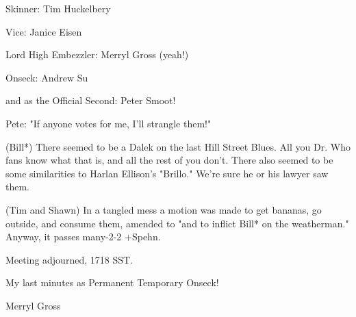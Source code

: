 \documentclass[12pt]{article}
\begin{document}
Skinner: Tim Huckelbery

Vice: Janice Eisen

Lord High Embezzler: Merryl Gross (yeah!)

Onseck: Andrew Su

and as the Official Second: Peter Smoot!

Pete: "If anyone votes for me, I'll strangle them!"

(Bill*) There seemed to be a Dalek on the last Hill Street Blues. All you Dr. Who fans know what that is, and all the rest of you don't. There also seemed to be some similarities to Harlan Ellison's "Brillo." We're sure he or his lawyer saw them.

(Tim and Shawn) In a tangled mess a motion was made to get bananas, go outside, and consume them, amended to "and to inflict Bill* on the weatherman." Anyway, it passes many-2-2 +Spehn.

\vspace{12pt}

\noindent
Meeting adjourned, 1718 SST.

\vspace{18pt}

\centerline{My last minutes as Permanent Temporary Onseck!}
\centerline{Merryl Gross}
\end{document}
